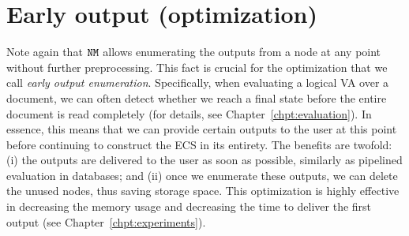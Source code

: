 %







\section{Early output (optimization)} 

Note again that $\mathtt{NM}$ allows enumerating the outputs from a node at any point
without further preprocessing. This fact is crucial for the optimization that we
call \emph{early output enumeration}. Specifically, when evaluating a logical VA
over a document, we can often detect whether we reach a final state before the
entire document is read completely (for details, see
Chapter~\ref{chpt:evaluation}). In essence, this means that we can provide
certain outputs to the user at this point before continuing to construct the ECS
in its entirety. The benefits are twofold: (i) the outputs are delivered to the
user as soon as possible, similarly as pipelined evaluation in databases; and
(ii) once we enumerate these outputs, we can delete the unused nodes, thus
saving storage space. This optimization is highly effective in decreasing the
memory usage and decreasing the time to deliver the first output (see
Chapter~\ref{chpt:experiments}).

